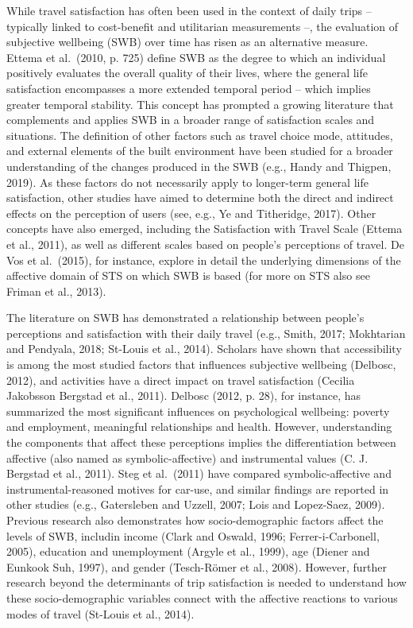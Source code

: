 \documentclass[]{elsarticle} %
\begin{document}
While travel satisfaction has often been used in the context of daily
trips -- typically linked to cost-benefit and utilitarian measurements
--, the evaluation of subjective wellbeing (SWB) over time has risen as
an alternative measure. Ettema et al.~(2010, p. 725) define SWB as the
degree to which an individual positively evaluates the overall quality
of their lives, where the general life satisfaction encompasses a more
extended temporal period -- which implies greater temporal stability.
This concept has prompted a growing literature that complements and
applies SWB in a broader range of satisfaction scales and situations.
The definition of other factors such as travel choice mode, attitudes,
and external elements of the built environment have been studied for a
broader understanding of the changes produced in the SWB (e.g., Handy
and Thigpen, 2019). As these factors do not necessarily apply to
longer-term general life satisfaction, other studies have aimed to
determine both the direct and indirect effects on the perception of
users (see, e.g., Ye and Titheridge, 2017). Other concepts have also
emerged, including the Satisfaction with Travel Scale (Ettema et al.,
2011), as well as different scales based on people's perceptions of
travel. De Vos et al.~(2015), for instance, explore in detail the
underlying dimensions of the affective domain of STS on which SWB is
based (for more on STS also see Friman et al., 2013).

The literature on SWB has demonstrated a relationship between people's
perceptions and satisfaction with their daily travel (e.g., Smith, 2017;
Mokhtarian and Pendyala, 2018; St-Louis et al., 2014). Scholars have
shown that accessibility is among the most studied factors that
influences subjective wellbeing (Delbosc, 2012), and activities have a
direct impact on travel satisfaction (Cecilia Jakobsson Bergstad et al.,
2011). Delbosc (2012, p. 28), for instance, has summarized the most
significant influences on psychological wellbeing: poverty and
employment, meaningful relationships and health. However, understanding
the components that affect these perceptions implies the differentiation
between affective (also named as symbolic-affective) and instrumental
values (C. J. Bergstad et al., 2011). Steg et al.~(2011) have compared
symbolic-affective and instrumental-reasoned motives for car-use, and
similar findings are reported in other studies (e.g., Gatersleben and
Uzzell, 2007; Lois and Lopez-Saez, 2009). Previous research also
demonstrates how socio-demographic factors affect the levels of SWB,
includin income (Clark and Oswald, 1996; Ferrer-i-Carbonell, 2005),
education and unemployment (Argyle et al., 1999), age (Diener and
Eunkook Suh, 1997), and gender (Tesch-Römer et al., 2008). However,
further research beyond the determinants of trip satisfaction is needed
to understand how these socio-demographic variables connect with the
affective reactions to various modes of travel (St-Louis et al., 2014).
\end{document}
